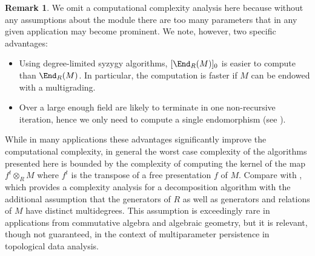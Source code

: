 \documentclass[12pt]{article}
\def\cF{\mathcal F}
\def\OO{\mathcal O}
\let\inc\hookrightarrow
\theoremstyle{theorem}
\numberwithin{thm}{section}
\newtheorem{lem}[thm]{Lemma}
\theoremstyle{definition}
\newtheorem{rem}[thm]{Remark}
\begin{document}


\begin{rem}\label{rem:complexity}
  We omit a computational complexity analysis here because without any assumptions about the module there are too many parameters that in any given application may become prominent. We note, however, two specific advantages:
  \begin{itemize}
  \item Using degree-limited syzygy algorithms, $[\End_R(M)]_0$ is easier to compute than $\End_R(M)$. In particular, the computation is faster if $M$ can be endowed with a multigrading.
  \item Over a large enough field  are likely to terminate in one non-recursive iteration, hence we only need to compute a single endomorphism (see ).
  \end{itemize}
   While in many applications these advantages significantly improve the computational complexity, in general the worst case complexity of the algorithms presented here is bounded by the complexity of computing the kernel of the map $f^t\otimes_R M$ where $f^t$ is the transpose of a free presentation $f$ of $M$. Compare with \cite{DX22}, which provides a complexity analysis for a decomposition algorithm with the additional assumption that the generators of $R$ as well as generators and relations of $M$ have distinct multidegrees. This assumption is exceedingly rare in applications from commutative algebra and algebraic geometry, but it is relevant, though not guaranteed, in the context of multiparameter persistence in topological data analysis.
\end{rem}
\end{document}
